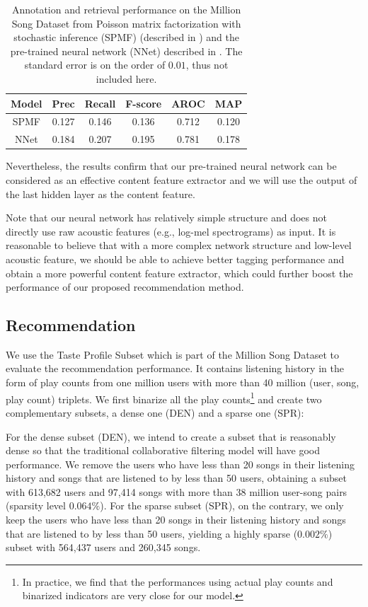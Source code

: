 \begin{table}
\centering
  \begin{tabular}{ c  c  c  c  c  c }
    \toprule
    Model & Prec & Recall & F-score & AROC & MAP \\ \midrule
     SPMF & 0.127  &  0.146 & 0.136 & 0.712 & 0.120 \\
     NNet &  0.184 & 0.207   &  0.195  & 0.781  & 0.178 \\
    \bottomrule
  \end{tabular}
  \caption{Annotation and retrieval performance on the Million Song Dataset from Poisson matrix factorization with stochastic inference (SPMF) (described in ) and the pre-trained neural network (NNet) described in . The standard error is on the order of $0.01$, thus not included here.} 
  \label{chpt:content:tab:exp_tag}
\end{table}

Nevertheless, the results confirm that our pre-trained neural network can be considered as an effective content feature extractor and we will use the output of the last hidden layer as the content feature. 

Note that our neural network has relatively simple structure and does not directly use raw acoustic features (e.g., log-mel spectrograms) as input. It is reasonable to believe that with a more complex network structure and low-level acoustic feature, we should be able to achieve better tagging performance and obtain a more powerful content feature extractor, which could further boost the performance of our proposed recommendation method. 

 
\subsection{Recommendation}\label{chpt:content:sec:exp_rec}

We use the Taste Profile Subset which is part of the Million Song Dataset to evaluate the recommendation performance. It contains listening history in the form of play counts from one million users with more than 40 million (user, song, play count) triplets. We first binarize all the play counts\footnote{In practice, we find that the performances using actual play counts and binarized indicators are very close for our model.} and create two complementary subsets, a dense one (DEN) and a sparse one (SPR):

For the dense subset (DEN), we intend to create a subset that is reasonably dense so that the traditional collaborative filtering model will have good performance. We remove the users who have less than 20 songs in their listening history and songs that are listened to by less than 50 users, obtaining a subset with 613,682 users and 97,414 songs with more than 38 million user-song pairs (sparsity level $0.064\%$). For the sparse subset (SPR), on the contrary, we only keep the users who have less than 20 songs in their listening history and songs that are listened to by less than 50 users, yielding a highly sparse ($0.002\%$) subset with 564,437 users and 260,345 songs.

